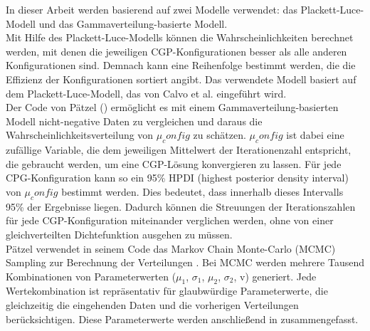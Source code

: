 In dieser Arbeit werden basierend auf \cite{cui_equidistant_2023} zwei Modelle verwendet: das Plackett-Luce-Modell und das Gammaverteilung-basierte Modell.\\
Mit Hilfe des Plackett-Luce-Modells können die Wahrscheinlichkeiten berechnet werden, mit denen die jeweiligen CGP-Konfigurationen besser als alle anderen Konfigurationen sind.
Demnach kann eine Reihenfolge bestimmt werden, die die Effizienz der Konfigurationen sortiert angibt.
Das verwendete Modell basiert auf dem Plackett-Luce-Modell, das von Calvo et al. eingeführt wird. \cite{cui_equidistant_2023, calvo_plackett_luce}\\
Der Code von Pätzel (\cite{patzel_dpaetzelcmpbayes_2024}) ermöglicht es mit einem Gammaverteilung-basierten Modell nicht-negative Daten zu vergleichen und daraus die Wahrscheinlichkeitsverteilung von $\mu_config$ zu schätzen.
$\mu_config$ ist dabei eine zufällige Variable, die dem jeweiligen Mittelwert der Iterationenzahl entspricht, die gebraucht werden, um eine CGP-Lösung konvergieren zu lassen.
Für jede CPG-Konfiguration kann so ein 95\% HPDI (highest posterior density interval) von $\mu_config$ bestimmt werden.
Dies bedeutet, dass innerhalb dieses Intervalls 95\% der Ergebnisse liegen. \cite{cui_equidistant_2023}
Dadurch können die Streuungen der Iterationszahlen für jede CGP-Konfiguration miteinander verglichen werden, ohne von einer gleichverteilten Dichtefunktion ausgehen zu müssen.\\

Pätzel verwendet in seinem Code das Markov Chain Monte-Carlo (MCMC) Sampling zur Berechnung der Verteilungen \cite{patzel_dpaetzelcmpbayes_2024, cui_equidistant_2023}.
Bei MCMC werden mehrere Tausend Kombinationen von Parameterwerten ($\mu_1$, $\sigma_1$, $\mu_2$, $\sigma_2$, v) generiert.
Jede Wertekombination ist repräsentativ für glaubwürdige Parameterwerte, die gleichzeitig die eingehenden Daten und die vorherigen Verteilungen berücksichtigen.
Diese Parameterwerte werden anschließend in zusammengefasst. \cite{kruschke_bayesian_estimation}

